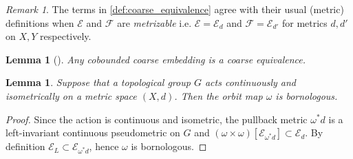 \documentclass[twoside]{amsart}
\theoremstyle{plain}
\newtheorem{lemma}[theorem]{Lemma}
\theoremstyle{break}
\theoremstyle{definition}
\theoremstyle{remark}
\newtheorem{remark*}[theorem]{Remark}
\begin{document}
\begin{remark*}
  The terms in \cref{def:coarse_equivalence} agree with their
  usual (metric) definitions when $\mathcal{E}$ and $\mathcal{F}$ are
  \textit{metrizable} i.e. $\mathcal{E} = \mathcal{E}_d$
  and $\mathcal{F} = \mathcal{E}_{d'}$ for metrics $d,d'$ on
  $X,Y$ respectively. 
\end{remark*}


\begin{lemma}[{\cite[Lem. 2.45]{rosendal}}]\label{lem:ce_char}
  Any cobounded coarse embedding is a coarse equivalence.
\end{lemma}

\begin{lemma}\label{lem:cbaction}
  Suppose that a topological group $G$ acts continuously and isometrically 
  on a metric space $(X,d)$. Then the orbit map $\omega$ is
  bornologous.
\end{lemma}


\begin{proof}
  Since the action is continuous and isometric, the pullback metric
  $\omega^* d$ is a left-invariant continuous pseudometric on $G$
  and $(\omega \times \omega)[\mathcal{E}_{\omega^*d}] \subset
  \mathcal{E}_{d}$.  By definition $\mathcal{E}_L \subset
  \mathcal{E}_{\omega^*d}$, hence $\omega$ is bornologous.
\end{proof}

\end{document}
